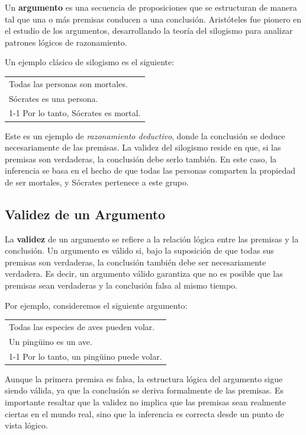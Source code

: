 Un \textbf{argumento} es una secuencia de proposiciones que se estructuran de manera tal que una o más premisas conducen a una conclusión. Aristóteles fue pionero en el estudio de los argumentos, desarrollando la teoría del silogismo para analizar patrones lógicos de razonamiento.

Un ejemplo clásico de silogismo es el siguiente:

\begin{center}
\begin{tabular}{l}
Todas las personas son mortales.  \\
Sócrates es una persona.  \\
\cline{1-1}
Por lo tanto, Sócrates es mortal. 
\end{tabular}
\end{center}

Este es un ejemplo de \textit{razonamiento deductivo}, donde la conclusión se deduce necesariamente de las premisas. La validez del silogismo reside en que, si las premisas son verdaderas, la conclusión debe serlo también.
En este caso, la inferencia se basa en el hecho de que todas las personas comparten la propiedad de ser mortales, y Sócrates pertenece a este grupo.

\subsection{Validez de un Argumento}
La \textbf{validez} de un argumento se refiere a la relación lógica entre las premisas y la conclusión. Un argumento es válido si, bajo la suposición de que todas sus premisas son verdaderas, la conclusión también debe ser necesariamente verdadera. Es decir, un argumento válido garantiza que no es posible que las premisas sean verdaderas y la conclusión falsa al mismo tiempo.

Por ejemplo, consideremos el siguiente argumento:

\begin{center}
\begin{tabular}{l}
Todas las especies de aves pueden volar. \\
Un pingüino es un ave. \\
\cline{1-1}
Por lo tanto, un pingüino puede volar. 
\end{tabular}
\end{center}

Aunque la primera premisa es falsa, la estructura lógica del argumento sigue siendo válida, ya que la conclusión se deriva formalmente de las premisas. Es importante resaltar que la validez no implica que las premisas sean realmente ciertas en el mundo real, sino que la inferencia es correcta desde un punto de vista lógico.\\

